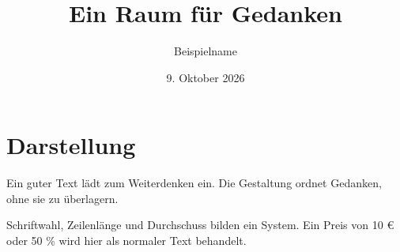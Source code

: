 \documentclass[11pt,a4paper,ngerman]{scrartcl}
\title{Ein Raum für Gedanken}
\author{Beispielname}
\date{9. Oktober 2026}
\begin{document}
\maketitle
\section*{Darstellung}
Ein guter Text lädt zum Weiterdenken ein. Die Gestaltung ordnet Gedanken, ohne sie zu überlagern.

Schriftwahl, Zeilenlänge und Durchschuss bilden ein System. Ein Preis von 10 € oder 50 \% wird hier als normaler Text behandelt.
\end{document}
